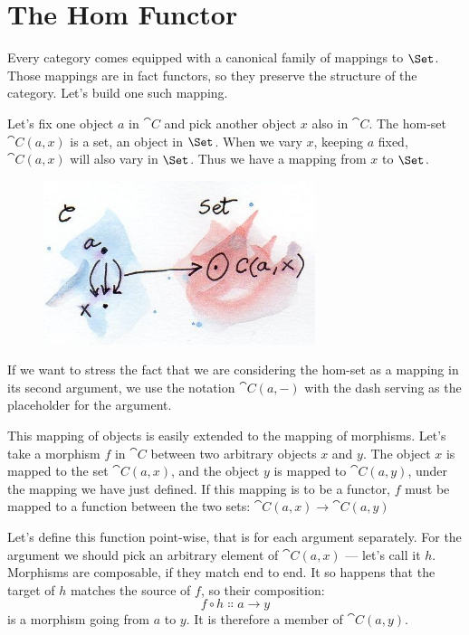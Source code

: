 \section{The Hom Functor}

Every category comes equipped with a canonical family of mappings to
$\Set$. Those mappings are in fact functors, so they preserve the
structure of the category. Let's build one such mapping.

Let's fix one object $a$ in $\cat{C}$ and pick another object
$x$ also in $\cat{C}$. The hom-set $\cat{C}(a, x)$ is a set, an
object in $\Set$. When we vary $x$, keeping $a$
fixed, $\cat{C}(a, x)$ will also vary in $\Set$. Thus we have a
mapping from $x$ to $\Set$.

\begin{figure}[H]
\centering
\includegraphics[width=3.12500in]{images/hom-set.jpg}
\end{figure}

\noindent
If we want to stress the fact that we are considering the hom-set as a
mapping in its second argument, we use the notation $\cat{C}(a, -)$
with the dash serving as the placeholder for the argument.

This mapping of objects is easily extended to the mapping of morphisms.
Let's take a morphism $f$ in $\cat{C}$ between two arbitrary
objects $x$ and $y$. The object $x$ is mapped to
the set $\cat{C}(a, x)$, and the object $y$ is mapped to
$\cat{C}(a, y)$, under the mapping we have just defined. If this
mapping is to be a functor, $f$ must be mapped to a function
between the two sets: $\cat{C}(a, x) \to \cat{C}(a, y)$

Let's define this function point-wise, that is for each argument
separately. For the argument we should pick an arbitrary element of
$\cat{C}(a, x)$ --- let's call it $h$. Morphisms are
composable, if they match end to end. It so happens that the target of
$h$ matches the source of $f$, so their composition:
\[f \circ h \Colon a \to y\]
is a morphism going from $a$ to $y$. It is therefore a
member of $\cat{C}(a, y)$.

